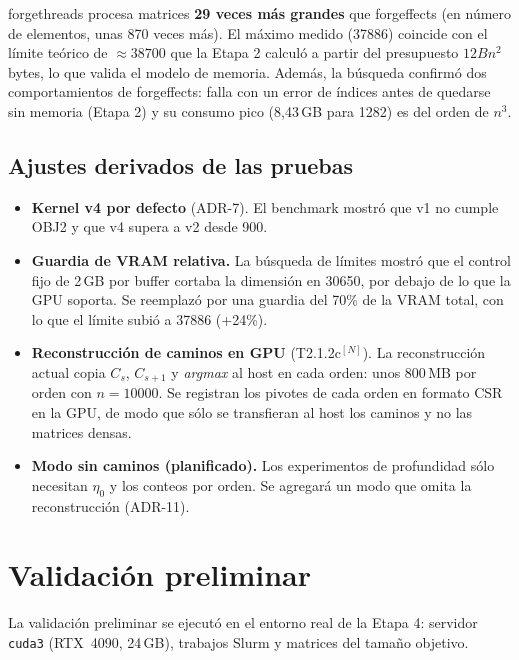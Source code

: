 \documentclass[11pt,a4paper]{article}
\newcommand{\N}{$^{[N]}$}
\begin{document}
forgethreads procesa matrices \textbf{29 veces más grandes} que forgeffects (en número de
elementos, unas 870 veces más). El máximo medido (\num{37886}) coincide con el límite teórico de
$\approx\num{38700}$ que la Etapa 2 calculó a partir del presupuesto $12Bn^2$ bytes, lo que valida
el modelo de memoria. Además, la búsqueda confirmó dos comportamientos de forgeffects: falla con
un error de índices antes de quedarse sin memoria (Etapa 2) y su consumo pico (8,43\,GB para
\num{1282}) es del orden de $n^3$.

\subsection{Ajustes derivados de las pruebas}
\begin{itemize}
  \item \textbf{Kernel v4 por defecto} (ADR-7). El benchmark mostró que v1 no cumple OBJ2 y que
        v4 supera a v2 desde 900.
  \item \textbf{Guardia de VRAM relativa.} La búsqueda de límites mostró que el control fijo de
        2\,GB por buffer cortaba la dimensión en \num{30650}, por debajo de lo que la GPU
        soporta. Se reemplazó por una guardia del 70\% de la VRAM total, con lo que el límite
        subió a \num{37886} (+24\%).
  \item \textbf{Reconstrucción de caminos en GPU} (T2.1.2c\N). La reconstrucción actual copia
        $C_s$, $C_{s+1}$ y \emph{argmax} al host en cada orden: unos 800\,MB por orden con
        $n=\num{10000}$. Se registran los pivotes de cada orden en formato CSR en la GPU, de
        modo que sólo se transfieran al host los caminos y no las matrices densas.
  \item \textbf{Modo sin caminos (planificado).} Los experimentos de profundidad sólo necesitan
        $\eta_0$ y los conteos por orden. Se agregará un modo que omita la reconstrucción
        (ADR-11).
\end{itemize}
\section{Validación preliminar}\label{sec:validacion}
La validación preliminar se ejecutó en el entorno real de la Etapa 4: servidor
\texttt{cuda3} (RTX~4090, 24\,GB), trabajos Slurm y matrices del tamaño objetivo.
\end{document}
